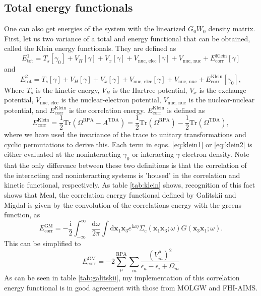 \documentclass[12pt]{caltech_thesis}
\begin{document}
\subsection{Total energy functionals}
One can also get energies of the system with the linearized $G_0W_0$ density matrix. First, let us two variance of a total and energy functional that can be obtained, called the Klein energy functionals. They are defined as
\begin{equation}
    E_{\text{tot}}^{\mathrm{1}} = T_s [\gamma _{0}] + V_H [\gamma ] + V_x [\gamma ] + V_{\text{nuc, elec}} [\gamma ] + V_{\text{nuc, nuc}} + E_{\text{corr}} ^{\text{Klein}}[\gamma ]
\label{eq:klein1}
\end{equation}
and
\begin{equation}
    E_{\text{tot}}^2 = T_s [\gamma ] + V_H [\gamma ] + V_x [\gamma ] + V_{\text{nuc, elec}} [\gamma ] + V_{\text{nuc, nuc}} + E_{\text{corr}} ^{\text{Klein}}[\gamma_0],
\label{eq:klein2}
\end{equation}
Where $T_s$ is the kinetic energy, $V_H$ is the Hartree potential, $V_x$ is the exchange potential, $V_{\text{nuc, elec}}$ is the nuclear-electron potential, $V_{\text{nuc, nuc}}$ is the nuclear-nuclear potential, and $E_{\text{corr}} ^{\text{Klein}}$ is the correlation energy. $E_{\text{corr}} ^{\text{Klein}}$ is defined as
\begin{equation}
    E_{\text{corr}}^{\text{Klein}} = \frac{1}{2} \text{Tr} (\Omega ^{\text{RPA}} - A^{\text{TDA}})
    = \frac{1}{2} \text{Tr} (\Omega ^{\text{RPA}} ) - \frac{1}{2} \text{Tr} (\Omega ^{\text{TDA}}),
\end{equation}
where we have used the invariance of the trace to unitary transformations and cyclic permutations to derive this.
Each term in eqns. \ref{eq:klein1} or \ref{eq:klein2} is either evaluated at the noninteracting $\gamma _{0}$ or interacting $\gamma $ electron density. Note that the only difference between these two definitions is that the correlation of the interacting and noninteracting systems is 'housed' in the correlation and kinetic functional, respectively. As table \ref{tab:klein} shows, recognition of this fact shows that
Meal, the correlation energy functional defined by Galitskii and Migdal is given by the convolution of the correlations energy with the greens function, as 
\begin{equation}
E_{\mathrm{corr}}^{\mathrm{GM}}=-\frac{\mathrm{i}}{2} \int_{-\infty}^{\infty} \frac{\mathrm{d} \omega}{2 \pi} \int \mathrm{d} \boldsymbol{x}_1 \boldsymbol{x}_3 e^{\mathrm{i} \omega \eta} \Sigma_{\mathrm{c}}\left(\boldsymbol{x}_1 \boldsymbol{x}_3 ; \omega\right) G\left(\boldsymbol{x}_3 \boldsymbol{x}_1 ; \omega\right).
\end{equation}
This can be simplified to
\begin{equation}
E_{\mathrm{corr}}^{\mathrm{GM}}=-2\sum_{\mu}^\mathrm{RPA} \sum_{i a} \frac{(V_{ia}^{\mu})^2}{\epsilon_a-\epsilon_i+\Omega_m}
\label{eq:GM}
\end{equation}
As can be seen in table \ref{tab:galitskii}, my implementation of this correlation energy functional is in good agreement with those from MOLGW and FHI-AIMS.
\end{document}
